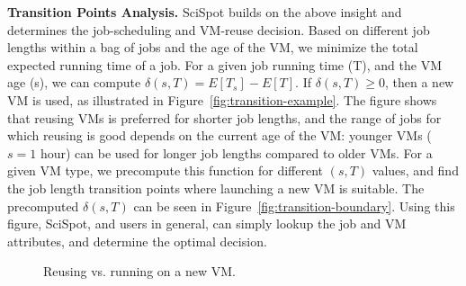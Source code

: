 \noindent \textbf{Transition Points Analysis.}
SciSpot builds on the above insight and determines the job-scheduling and VM-reuse decision.
Based on different job lengths within a bag of jobs and the age of the VM, we minimize the total expected running time of a job.
For a given job running time (T), and the VM age (s), we can compute  $\delta(s,T) = E[T_s] - E[T]$.
If $\delta(s,T) \geq 0$, then a new VM is used, as illustrated in Figure~\ref{fig:transition-example}.
The figure shows that reusing VMs is preferred for shorter job lengths, and the range of jobs for which reusing is good depends on the current age of the VM: younger VMs ($s=1$ hour) can be used for longer job lengths compared to older VMs. 
For a given VM type, we precompute this function for different $(s, T)$ values, and find the job length transition points where launching a new VM is suitable. 
The precomputed $\delta(s,T)$ can be seen in Figure~\ref{fig:transition-boundary}.
Using this figure, SciSpot, and users in general, can simply lookup the job and VM attributes, and determine the optimal decision. 




\begin{figure}[t]
  \hfill
  \label{fig:transition-all}
  \caption{Reusing vs. running on a new VM.}
\end{figure}

